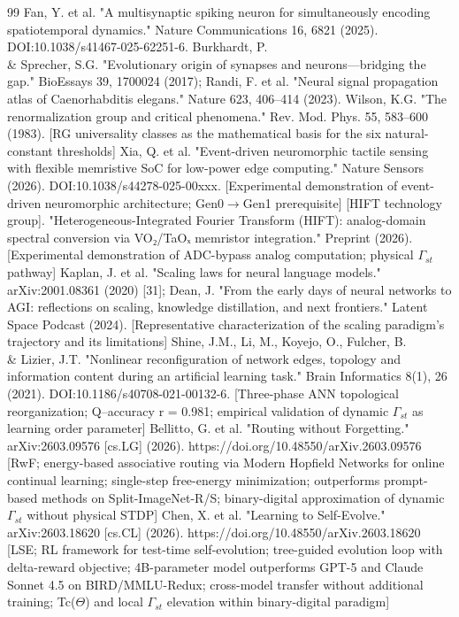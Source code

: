 \documentclass[a4paper,12pt]{article}
\begin{document}
\begin{thebibliography}{99}
 Fan, Y. et al. "A multisynaptic spiking neuron for simultaneously encoding spatiotemporal dynamics." Nature Communications 16, 6821 (2025). DOI:10.1038/s41467-025-62251-6.
 Burkhardt, P. \\& Sprecher, S.G. "Evolutionary origin of synapses and neurons---bridging the gap." BioEssays 39, 1700024 (2017); Randi, F. et al. "Neural signal propagation atlas of Caenorhabditis elegans." Nature 623, 406--414 (2023).
 Wilson, K.G. "The renormalization group and critical phenomena." Rev. Mod. Phys. 55, 583--600 (1983). [RG universality classes as the mathematical basis for the six natural-constant thresholds]
 Xia, Q. et al. "Event-driven neuromorphic tactile sensing with flexible memristive SoC for low-power edge computing." Nature Sensors (2026). DOI:10.1038/s44278-025-00xxx. [Experimental demonstration of event-driven neuromorphic architecture; Gen0$\rightarrow$Gen1 prerequisite]
 [HIFT technology group]. "Heterogeneous-Integrated Fourier Transform (HIFT): analog-domain spectral conversion via VO₂/TaOₓ memristor integration." Preprint (2026). [Experimental demonstration of ADC-bypass analog computation; physical $\Gamma_{st}$ pathway]
 Kaplan, J. et al. "Scaling laws for neural language models." arXiv:2001.08361 (2020) [31]; Dean, J. "From the early days of neural networks to AGI: reflections on scaling, knowledge distillation, and next frontiers." Latent Space Podcast (2024). [Representative characterization of the scaling paradigm's trajectory and its limitations]
 Shine, J.M., Li, M., Koyejo, O., Fulcher, B. \\& Lizier, J.T. "Nonlinear reconfiguration of network edges, topology and information content during an artificial learning task." Brain Informatics 8(1), 26 (2021). DOI:10.1186/s40708-021-00132-6. [Three-phase ANN topological reorganization; Q--accuracy r = 0.981; empirical validation of dynamic $\Gamma_{st}$ as learning order parameter]
 Bellitto, G. et al. "Routing without Forgetting." arXiv:2603.09576 [cs.LG] (2026). https://doi.org/10.48550/arXiv.2603.09576 [RwF; energy-based associative routing via Modern Hopfield Networks for online continual learning; single-step free-energy minimization; outperforms prompt-based methods on Split-ImageNet-R/S; binary-digital approximation of dynamic $\Gamma_{st}$ without physical STDP]
 Chen, X. et al. "Learning to Self-Evolve." arXiv:2603.18620 [cs.CL] (2026). https://doi.org/10.48550/arXiv.2603.18620 [LSE; RL framework for test-time self-evolution; tree-guided evolution loop with delta-reward objective; 4B-parameter model outperforms GPT-5 and Claude Sonnet 4.5 on BIRD/MMLU-Redux; cross-model transfer without additional training; Tc($\Theta$) and local $\Gamma_{st}$ elevation within binary-digital paradigm]

\end{thebibliography}
\end{document}
